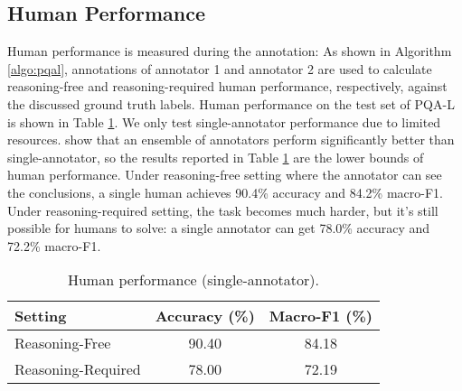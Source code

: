 \documentclass[11pt,a4paper]{article}
\begin{document}
\subsection{Human Performance} \label{human}
Human performance is measured during the annotation: As shown in Algorithm \ref{algo:pqal}, annotations of annotator 1 and annotator 2 are used to calculate reasoning-free and reasoning-required human performance, respectively, against the discussed ground truth labels. Human performance on the test set of PQA-L is shown in Table \ref{tab:human}. We only test single-annotator performance due to limited resources. \citet{kwiatkowski2019natural} show that an ensemble of annotators perform significantly better than single-annotator, so the results reported in Table \ref{tab:human} are the lower bounds of human performance. Under reasoning-free setting where the annotator can see the conclusions, a single human achieves 90.4\% accuracy and 84.2\% macro-F1. Under reasoning-required setting, the task becomes much harder, but it's still possible for humans to solve: a single annotator can get 78.0\% accuracy and 72.2\% macro-F1.
\begin{table}[htbp]
\centering
\small
\begin{tabular}{lcc}
\toprule
\textbf{Setting} & \textbf{Accuracy (\%)} & \textbf{Macro-F1 (\%)} \\
\midrule
Reasoning-Free & 90.40 & 84.18 \\
Reasoning-Required & 78.00 & 72.19 \\
\bottomrule
\end{tabular}
\vskip -0.15cm
\caption{Human performance (single-annotator).}
\label{tab:human}
\end{table}
\end{document}
